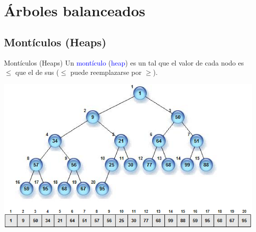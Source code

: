 \documentclass[handout]{beamer} %
\newcommand{\blue}[1]{\textcolor{blue}{#1}}
\newcommand{\redb}[1]{{\color{red!70!black}{#1}}}
\newcommand{\green}[1]{{\color{green!70!black}{#1}}}
\begin{document}

\section{Árboles balanceados}

\subsection{Montículos (Heaps)}

\begin{frame}{Montículos (Heaps)}
    Un \blue{montículo} (\blue{heap}) es un \redb{árbol completo} tal que el valor de cada nodo es $\leq$ que el de sus \redb{descendientes} {\small ($\leq$ puede reemplazarse por $\geq$)}.
    \begin{center}
        \includegraphics[width=.9\textwidth]{./image/cap3/heap}
    \end{center}
\end{frame}
\end{document}
